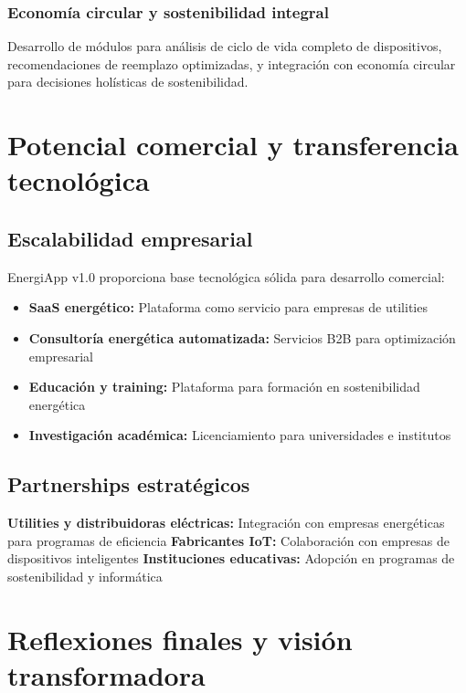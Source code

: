 \subsubsection{Economía circular y sostenibilidad integral}

Desarrollo de módulos para análisis de ciclo de vida completo de dispositivos, recomendaciones de reemplazo optimizadas, y integración con economía circular para decisiones holísticas de sostenibilidad.

\section{Potencial comercial y transferencia tecnológica}

\subsection{Escalabilidad empresarial}

EnergiApp v1.0 proporciona base tecnológica sólida para desarrollo comercial:

\begin{itemize}
    \item \textbf{SaaS energético:} Plataforma como servicio para empresas de utilities
    \item \textbf{Consultoría energética automatizada:} Servicios B2B para optimización empresarial
    \item \textbf{Educación y training:} Plataforma para formación en sostenibilidad energética
    \item \textbf{Investigación académica:} Licenciamiento para universidades e institutos
\end{itemize}

\subsection{Partnerships estratégicos}

\textbf{Utilities y distribuidoras eléctricas:} Integración con empresas energéticas para programas de eficiencia
\textbf{Fabricantes IoT:} Colaboración con empresas de dispositivos inteligentes
\textbf{Instituciones educativas:} Adopción en programas de sostenibilidad y informática

\section{Reflexiones finales y visión transformadora}

